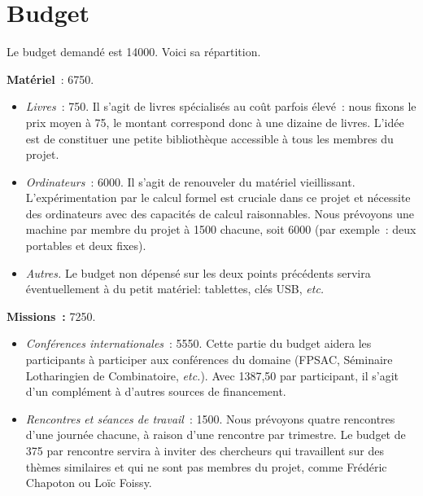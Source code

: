 \documentclass[10pt,reqno]{amsart}
\numberwithin{equation}{subsection}
\begin{document}

\section{Budget}
Le budget demandé est 14000\texteuro. Voici sa répartition.
\smallskip

{\bf Matériel}~: 6750\texteuro.
\begin{itemize}[fullwidth]
    \item {\em Livres}~: 750\texteuro.
    Il s'agit de livres spécialisés au coût parfois élevé~: nous
    fixons le prix moyen à 75\texteuro, le montant correspond donc
    à une dizaine de livres. L'idée est de constituer une petite
    \og bibliothèque \fg{} accessible à tous les membres du projet.

    \item {\em Ordinateurs}~: 6000\texteuro.
    Il s'agit de renouveler du matériel vieillissant.
    L'expérimentation par le calcul formel est cruciale dans ce
    projet et nécessite des ordinateurs avec des capacités de calcul
    raisonnables. Nous prévoyons une machine par membre du projet à
    1500\texteuro{} chacune, soit 6000\texteuro{} (par exemple~:
    deux portables et deux fixes).

    \item {\em Autres.}
    Le budget non dépensé sur les deux points précédents servira
    éventuellement à du petit matériel: tablettes, clés USB, {\em etc.}
\end{itemize}
\smallskip
    
{\bf Missions~:} 7250\texteuro.
\begin{itemize}[fullwidth]
    \item {\em Conférences internationales}~: 5550\texteuro.
    Cette partie du budget aidera les participants à participer aux
    conférences du domaine (FPSAC, Séminaire Lotharingien de
    Combinatoire, {\em etc.}). Avec 1387,50\texteuro{} par participant,
    il s'agit d'un complément à d'autres sources de financement.

    \item {\em Rencontres et séances de travail}~: 1500\texteuro.
    Nous prévoyons quatre
    rencontres d'une journée chacune, à raison d'une rencontre par
    trimestre. 
    Le budget
    de 375\texteuro{} par rencontre servira à inviter des chercheurs
    qui travaillent sur des thèmes similaires et qui ne sont pas
    membres du projet, comme Frédéric Chapoton ou Loïc Foissy.
\end{itemize}
\end{document}
